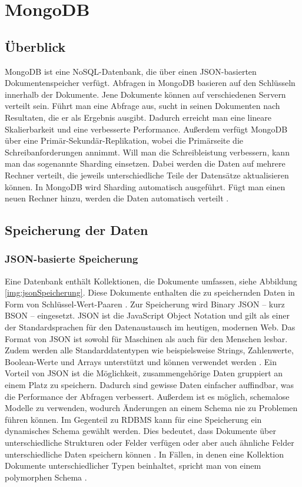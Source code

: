 \chapter{MongoDB}

\section{Überblick}
MongoDB ist eine NoSQL-Datenbank, die über einen JSON-basierten Dokumentenspeicher verfügt. Abfragen in MongoDB basieren auf den Schlüsseln innerhalb der Dokumente. Jene Dokumente können auf verschiedenen Servern verteilt sein. Führt man eine Abfrage aus, sucht in seinen Dokumenten nach Resultaten, die er als Ergebnis ausgibt. Dadurch erreicht man eine lineare Skalierbarkeit und eine verbesserte Performance. 
Außerdem verfügt MongoDB über eine Primär-Sekundär-Replikation, wobei die Primärseite die Schreibanforderungen annimmt. Will man die Schreibleistung verbessern, kann man das sogenannte Sharding einsetzen. Dabei werden die Daten auf mehrere Rechner verteilt, die jeweils unterschiedliche Teile der Datensätze aktualisieren können. In MongoDB wird Sharding automatisch ausgeführt. Fügt man einen neuen Rechner hinzu, werden die Daten automatisch verteilt \cite[S.26]{zwei}.

\section{Speicherung der Daten}
\subsection{JSON-basierte Speicherung}
Eine Datenbank enthält Kollektionen, die Dokumente umfassen, siehe Abbildung \ref*{img:jsonSpeicherung}. Diese Dokumente enthalten die zu speichernden Daten \cite[S.30]{zwei} in Form von Schlüssel-Wert-Paaren \cite[S.27]{zwei}. Zur Speicherung wird Binary JSON – kurz BSON – eingesetzt. JSON ist die JavaScript Object Notation und gilt als einer der Standardsprachen für den Datenaustausch im heutigen, modernen Web. Das Format von JSON ist sowohl für Maschinen als auch für den Menschen lesbar. Zudem werden alle Standarddatentypen wie beispielsweise Strings, Zahlenwerte, Boolean-Werte und Arrays unterstützt und können verwendet werden \cite[S.31]{zwei}. 
Ein Vorteil von JSON ist die Möglichkeit, zusammengehörige Daten gruppiert an einem Platz zu speichern. Dadurch sind gewisse Daten einfacher auffindbar, was die Performance der Abfragen verbessert. Außerdem ist es möglich, schemalose Modelle zu verwenden, wodurch Änderungen an einem Schema nie zu Problemen führen können.
Im Gegenteil zu RDBMS kann für eine Speicherung ein dynamisches Schema gewählt werden. Dies bedeutet, dass Dokumente über unterschiedliche Strukturen oder Felder verfügen oder aber auch ähnliche Felder unterschiedliche Daten speichern können \cite[S.26f.]{zwei}. In Fällen, in denen eine Kollektion Dokumente unterschiedlicher Typen beinhaltet, spricht man von einem polymorphen Schema \cite[S.32]{zwei}.

